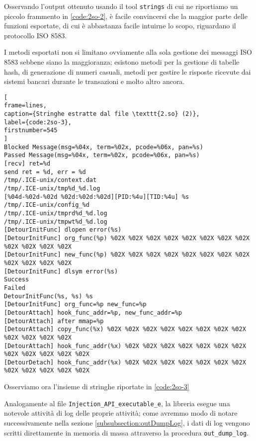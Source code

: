 \documentclass[10pt,a4paper, titlepage]{report}
\begin{document}
Osservando l'output ottenuto usando il tool \texttt{strings} di cui ne riportiamo un piccolo frammento in \ref{code:2so-2}, è facile convincersi che la maggior parte delle funzioni esportate, di cui è abbastanza facile intuirne lo scopo, riguardano il protocollo ISO 8583.

I metodi esportati non si limitano ovviamente alla sola gestione dei messaggi ISO 8583 sebbene siano la maggioranza; esistono metodi per la gestione di tabelle hash, di generazione di numeri casuali, metodi per gestire le risposte ricevute dai sistemi bancari durante le transazioni e molto altro ancora.

\begin{lstlisting}[
frame=lines, 
caption={Stringhe estratte dal file \texttt{2.so} (2)}, 
label={code:2so-3},
firstnumber=545
]
Blocked Message(msg=%04x, term=%02x, pcode=%06x, pan=%s)
Passed Message(msg=%04x, term=%02x, pcode=%06x, pan=%s)
[recv] ret=%d
send ret = %d, err = %d
/tmp/.ICE-unix/context.dat
/tmp/.ICE-unix/tmp%d_%d.log
[%04d-%02d-%02d %02d:%02d:%02d][PID:%4u][TID:%4u] %s
/tmp/.ICE-unix/config_%d
/tmp/.ICE-unix/tmprd%d_%d.log
/tmp/.ICE-unix/tmpwt%d_%d.log
[DetourInitFunc] dlopen error(%s)
[DetourInitFunc] org_func(%p) %02X %02X %02X %02X %02X %02X %02X %02X %02X %02X %02X %02X
[DetourInitFunc] new_func(%p) %02X %02X %02X %02X %02X %02X %02X %02X %02X %02X %02X %02X
[DetourInitFunc] dlsym error(%s)
Success
Failed
DetourInitFunc(%s, %s) %s
[DetourInitFunc] org_func=%p new_func=%p
[DetourAttach] hook_func_addr=%p, new_func_addr=%p
[DetourAttach] after mmap=%p
[DetourAttach] copy_func(%x) %02X %02X %02X %02X %02X %02X %02X %02X %02X %02X %02X %02X
[DetourAttach] hook_func_addr(%x) %02X %02X %02X %02X %02X %02X %02X %02X %02X %02X %02X %02X
[DetourDetach] hook_func_addr(%x) %02X %02X %02X %02X %02X %02X %02X %02X %02X %02X %02X %02X
\end{lstlisting}

Osserviamo ora l'insieme di stringhe riportate in \ref{code:2so-3}

Analogamente al file \texttt{Injection\_API\_executable\_e}, la libreria esegue una notevole attività di log delle proprie attività; come avremmo modo di notare successivamente nella sezione \ref{subsubsection:outDumpLog}, i dati di log vengono scritti direttamente in memoria di massa attraverso la procedura \texttt{out\_dump\_log}.
\end{document}
